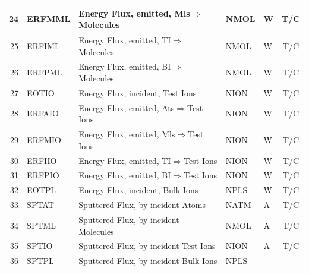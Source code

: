 \begin{landscape}
\begin{longtable}{|r|l|l|l|l|c|}
    \hline
    24                     & ERFMML         & Energy Flux, emitted,
    \ac{Mls}$\Rightarrow$Molecules & NMOL           & \si{\watt}                      & T/C
    \\
    \hline
    25                     & ERFIML         & Energy Flux, emitted,
    \ac{TI}$\Rightarrow$Molecules & NMOL           & \si{\watt}                      & T/C
    \\
    \hline
    26                     & ERFPML         & Energy Flux, emitted,
    \ac{BI}$\Rightarrow$Molecules & NMOL           & \si{\watt}                      & T/C
    \\
    \hline
    27                     & EOTIO          & Energy Flux, incident, Test
    Ions                   & NION
			   & \si{\watt}     & T/C
    \\   \hline
    28                     & ERFAIO         & Energy Flux, emitted,
    \ac{Ats}$\Rightarrow$Test Ions & NION           & \si{\watt}                      & T/C
    \\
    \hline
    29                     & ERFMIO         & Energy Flux, emitted,
    \ac{Mls}$\Rightarrow$Test Ions & NION           & \si{\watt}                      & T/C
    \\
    \hline
    30                     & ERFIIO         & Energy Flux, emitted,
    \ac{TI}$\Rightarrow$Test Ions & NION           & \si{\watt}                      & T/C
    \\
    \hline
    31                     & ERFPIO         & Energy Flux, emitted,
    \ac{BI}$\Rightarrow$Test Ions & NION           & \si{\watt}                      & T/C
    \\
    \hline
    32                     & EOTPL          & Energy Flux, incident, Bulk
    Ions                   & NPLS
			   & \si{\watt}     & T/C
    \\   \hline
    33                     & SPTAT          & Sputtered Flux, by incident
    Atoms                  & NATM
			   & \si{\ampere}   & T/C
    \\ \hline
    34                     & SPTML          & Sputtered Flux, by incident
    Molecules              & NMOL
			   & \si{\ampere}   & T/C
    \\  \hline
    35                     & SPTIO          & Sputtered Flux, by incident
    Test Ions              & NION
			   & \si{\ampere}   & T/C
    \\    \hline
    36                     & SPTPL          & Sputtered Flux, by incident
    Bulk Ions              & NPLS

\end{longtable}
\end{landscape}
